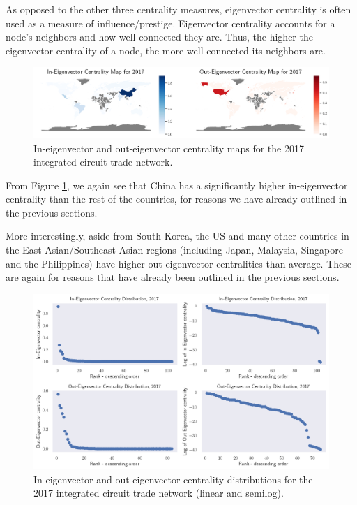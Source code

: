 \documentclass[12pt,letterpaper]{report}
\begin{document}
			As opposed to the other three centrality measures, eigenvector centrality is often used as a measure of influence/prestige. Eigenvector centrality accounts for a node's neighbors and how well-connected they are. Thus, the higher the eigenvector centrality of a node, the more well-connected its neighbors are.
			
			\begin{figure}[!h]
				\centering
				\includegraphics[width=\textwidth]{Fig511-EigenvectorMap.png}
				\caption{In-eigenvector and out-eigenvector centrality maps for the 2017 integrated circuit trade network.}\label{fig:511EigenvectorMap}
			\end{figure}
			
			From Figure \ref{fig:511EigenvectorMap}, we again see that China has a significantly higher in-eigenvector centrality than the rest of the countries, for reasons we have already outlined in the previous sections.
			
			More interestingly, aside from South Korea, the US and many other countries in the East Asian/Southeast Asian regions (including Japan, Malaysia, Singapore and the Philippines) have higher out-eigenvector centralities than average. These are again for reasons that have already been outlined in the previous sections.
			
			\begin{figure}[!h]
				\centering
				\includegraphics[width=\textwidth]{Fig512-EigenvectorDistribution.png}
				\caption{In-eigenvector and out-eigenvector centrality distributions for the 2017 integrated circuit trade network (linear and semilog).}\label{fig:512EigenvectorDistribution}
			\end{figure}
			
\end{document}
